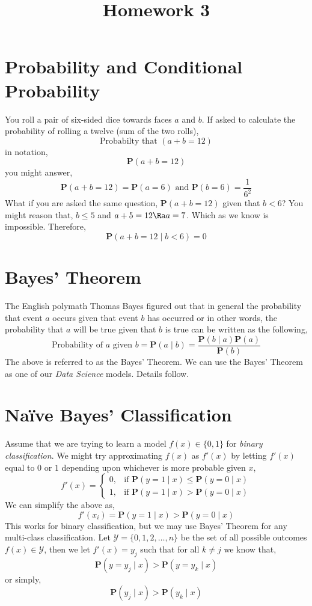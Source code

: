 \documentclass{homework}
\title{Homework 3}
\renewcommand\P{\mathbf{P}}
\newcommand\Y{\mathcal{Y}}
\begin{document}
 \maketitle

\section{Probability and Conditional Probability}

You roll a pair of six-sided dice towards faces $a$ and $b$. If asked
to calculate the probability of rolling a twelve (sum of the two
rolls),
\[
  \text{Probabilty that }(a+b=12)
\]
in notation,
\[
  \P(a+b=12)
\]
you might answer,
\[
  \P(a+b=12) = \P(a = 6) \text{ and } \P(b = 6) = \frac{1}{6^2}
\]
What if you are asked the same question, $\P(a+b=12)$ given that
$b < 6$? You might reason that, $b \leq 5$ and $a+5=12 \Ra a =
  7$. Which as we know is impossible. Therefore,
\[
  \P(a+b=12 \mid b < 6) = 0
\]

\section{Bayes' Theorem}

The English polymath Thomas Bayes figured out that in general the
probability that event $a$ occurs given that event $b$ has occurred or
in other words, the probability that $a$ will be true given that $b$
is true can be written as the following,
\[
  \text{Probability of } a \text{ given } b =
  \P(a \mid b) = \frac{\P(b \mid a)\P(a)}{\P(b)}
\]
The above is referred to as the Bayes' Theorem. We can use the Bayes'
Theorem as one of our \textit{Data Science} models. Details follow.

\section{Na\"ive Bayes' Classification}

Assume that we are trying to learn a model $f(x) \in \{0, 1\}$ for
\textit{binary classification}. We might try approximating $f(x)$ as
$f'(x)$ by letting $f'(x)$ equal to $0$ or $1$ depending upon
whichever is more probable given $x$,
\[
  f'(x) =
  \begin{cases}
    0, & \text{if } \P(y=1 \mid x) \leq \P(y=0 \mid x) \\
    1, & \text{if } \P(y=1 \mid x) > \P(y=0 \mid x)
  \end{cases}
\]
We can simplify the above as,
\[
  f'(x_i) = \P(y=1 \mid x) > \P(y=0 \mid x)
\]
This works for binary classification, but we may use Bayes' Theorem
for any multi-class classification. Let $\Y = \{0, 1, 2,\hdots, n\}$
be the set of all possible outcomes \ie $f(x) \in \Y$, then we let
$f'(x) = y_j$ such that for all $k \neq j$ we know that,
\[
  \P(y=y_j \mid x) >  \P(y=y_k \mid x)
\]
or simply,
\[
  \P(y_j \mid x) >  \P(y_k \mid x)
\]
\end{document}
